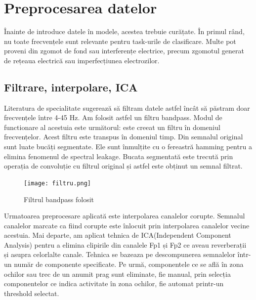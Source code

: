 \section{Preprocesarea datelor}
Înainte de introduce datele în modele, acestea trebuie curățate. În primul rând, nu toate frecvențele sunt relevante pentru task-urile de clasificare. Multe pot proveni din zgomot de fond sau interferențe electrice, precum zgomotul generat de rețeaua electrică sau imperfecțiunea electrozilor. 




\subsection{Filtrare, interpolare, ICA}

Literatura de specialitate sugerează să filtram datele astfel încât să păstram doar frecvențele între 4-45 Hz. Am folosit astfel un filtru bandpass. Modul de functionare al acestuia este următorul: este creeat un filtru în domeniul frecvențelor. Acest filtru este transpus în domeniul timp. Din semnalul original sunt luate bucăți segmentate. Ele sunt înmulțite cu o fereastră hamming pentru a elimina fenomenul de spectral leakage. Bucata segmentată este trecută prin operația de convoluție cu filtrul original și astfel este obținut un semnal filtrat.

\setlength{\abovecaptionskip}{0pt}
\setlength{\belowcaptionskip}{0pt}
\clearpage
\begin{figure}[h]
    \centering
    \texttt{[image: filtru.png]}
    \caption{Filtrul bandpass folosit}
    \label{fig:vizualizare_filtru}
\end{figure}

Urmatoarea preprocesare aplicată este interpolarea canalelor corupte. Semnalul canalelor marcate ca fiind corupte este înlocuit prin interpolarea canalelor vecine acestuia. Mai departe, am aplicat tehnica de ICA(Independent Component Analysis) pentru a elimina clipirile din canalele Fp1 și Fp2 ce aveau reverberații și asupra celorlalte canale. Tehnica se bazeaza pe descompunerea semnalelor într-un număr de componente specificate. Pe urmă, componentele ce se află în zona ochilor sau trec de un anumit prag sunt eliminate, fie manual, prin selecția componentelor ce indica activitate în zona ochilor, fie automat printr-un threshold selectat.

